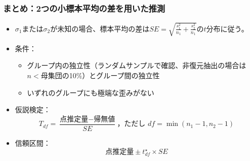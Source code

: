 \begin{frame}
\frametitle{まとめ：2つの小標本平均の差を用いた推測}

\begin{itemize}

\item $\sigma_1$または$\sigma_2$が未知の場合、標本平均の差は$SE = \sqrt{ \frac{s_1^2}{n_1} + \frac{s_2^2}{n_1} }$の$t$分布に従う。

\item 条件：
\begin{itemize}
\item グループ内の独立性（ランダムサンプルで確認、非復元抽出の場合は$n < $母集団の10\%）とグループ間の独立性
\item いずれのグループにも極端な歪みがない
\end{itemize}

\item 仮説検定：
\[ T_{df} = \frac{\text{点推定量} - \text{帰無値}}{SE}\text{，ただし }df = \min(n_1 - 1, n_2 - 1) \]

\item 信頼区間：
\[ \text{点推定量} \pm t_{df}^\star \times SE \]

\end{itemize}

\end{frame}

